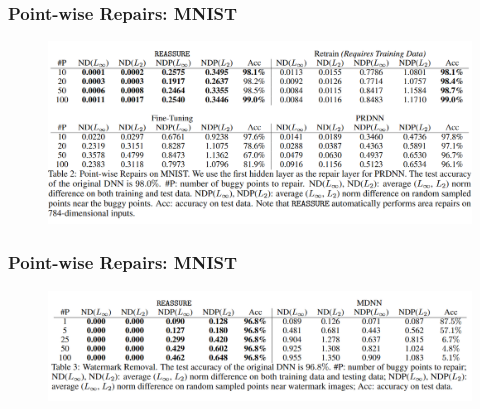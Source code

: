 \documentclass[aspectratio=169 %
,serif,mathserif]{beamer}
\begin{document}

\begin{frame}
	\frametitle{Point-wise Repairs: MNIST}
	\begin{figure}[htbp]
		\includegraphics[width=\linewidth]{9.png}
	\end{figure}
\end{frame}

\begin{frame}
	\frametitle{Point-wise Repairs: MNIST}
	\begin{figure}[htbp]
		\includegraphics[width=\linewidth]{10.png}
	\end{figure}
\end{frame}
\end{document}
